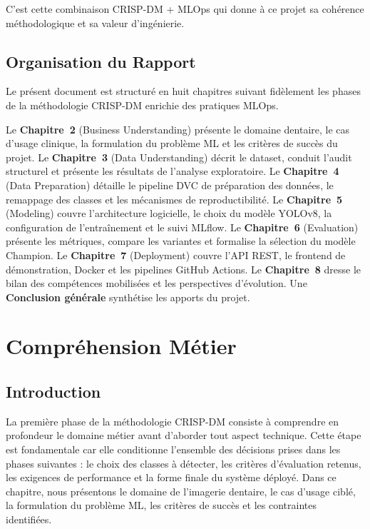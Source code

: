 \documentclass{rapportENSIAS}
\begin{document}
C'est cette combinaison CRISP-DM + MLOps qui donne à ce projet sa cohérence méthodologique et sa valeur d'ingénierie.

\section{Organisation du Rapport}

Le présent document est structuré en huit chapitres suivant fidèlement les phases de la méthodologie CRISP-DM enrichie des pratiques MLOps.

Le \textbf{Chapitre~2} (Business Understanding) présente le domaine dentaire, le cas d'usage clinique, la formulation du problème ML et les critères de succès du projet. Le \textbf{Chapitre~3} (Data Understanding) décrit le dataset, conduit l'audit structurel et présente les résultats de l'analyse exploratoire. Le \textbf{Chapitre~4} (Data Preparation) détaille le pipeline DVC de préparation des données, le remappage des classes et les mécanismes de reproductibilité. Le \textbf{Chapitre~5} (Modeling) couvre l'architecture logicielle, le choix du modèle YOLOv8, la configuration de l'entraînement et le suivi MLflow. Le \textbf{Chapitre~6} (Evaluation) présente les métriques, compare les variantes et formalise la sélection du modèle Champion. Le \textbf{Chapitre~7} (Deployment) couvre l'API REST, le frontend de démonstration, Docker et les pipelines GitHub Actions. Le \textbf{Chapitre~8} dresse le bilan des compétences mobilisées et les perspectives d'évolution. Une \textbf{Conclusion générale} synthétise les apports du projet.


\chapter{Compréhension Métier}

\section{Introduction}

La première phase de la méthodologie CRISP-DM consiste à comprendre en profondeur le domaine métier avant d'aborder tout aspect technique. Cette étape est fondamentale car elle conditionne l'ensemble des décisions prises dans les phases suivantes : le choix des classes à détecter, les critères d'évaluation retenus, les exigences de performance et la forme finale du système déployé. Dans ce chapitre, nous présentons le domaine de l'imagerie dentaire, le cas d'usage ciblé, la formulation du problème ML, les critères de succès et les contraintes identifiées.
\end{document}
